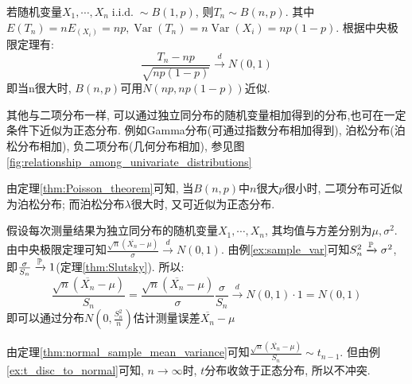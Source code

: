 \begin{example}[二项分布近似为正态分布]
    若随机变量$X_1,\cdots ,X_n \operatorname{i.i.d.} \sim B(1,p)$, 则$T_n \sim B(n,p)$. 其中$E(T_n)=nE_(X_i)=np, \operatorname{Var}(T_n)=n\operatorname{Var}(X_i)=np(1-p)$. 根据中央极限定理有:
    \[ \frac{T_n - np}{\sqrt{np(1-p)}} \xrightarrow{d} N(0,1) \]
    即当n很大时, $B(n,p)$可用$N(np,np(1-p))$近似.
\end{example}
\begin{remark}
    其他与二项分布一样, 可以通过独立同分布的随机变量相加得到的分布,也可在一定条件下近似为正态分布. 例如Gamma分布(可通过指数分布相加得到), 泊松分布(泊松分布相加), 负二项分布(几何分布相加), 参见图\ref{fig:relationship_among_univariate_distributions}
\end{remark}
\begin{remark}
    由定理\ref{thm:Poisson_theorem}可知, 当$B(n,p)$中$n$很大$p$很小时, 二项分布可近似为泊松分布; 而泊松分布$\lambda$很大时, 又可近似为正态分布.
\end{remark}

\begin{example}[测量误差估计]
    假设每次测量结果为独立同分布的随机变量$X_1,\cdots ,X_n$, 其均值与方差分别为$\mu,\sigma^2$. 由中央极限定理可知$\frac{\sqrt{n}(\overline{X_n}-\mu)}{\sigma} \xrightarrow{d} N(0,1)$. 由例\ref{ex:sample_var}可知$S_n^2 \xrightarrow{\P} \sigma^2$, 即$\frac{\sigma}{S_n} \xrightarrow{\P} 1$(定理\ref{thm:Slutsky}). 所以:
    \[ \frac{\sqrt{n}(\overline{X_n}-\mu)}{S_n}=\frac{\sqrt{n}(\overline{X_n}-\mu)}{\sigma}\frac{\sigma}{S_n} \xrightarrow{d} N(0,1)\cdot 1=N(0,1) \]
    即可以通过分布$N(0,\frac{S_n^2}{n})$估计测量误差$\overline{X_n}-\mu$
\end{example}
\begin{remark}
    由定理\ref{thm:normal_sample_mean_variance}可知$\frac{\sqrt{n}(\overline{X_n}-\mu)}{S_n} \sim t_{n-1}$. 但由例\ref{ex:t_disc_to_normal}可知, $n\to \infty$时, $t$分布收敛于正态分布, 所以不冲突.
\end{remark}
